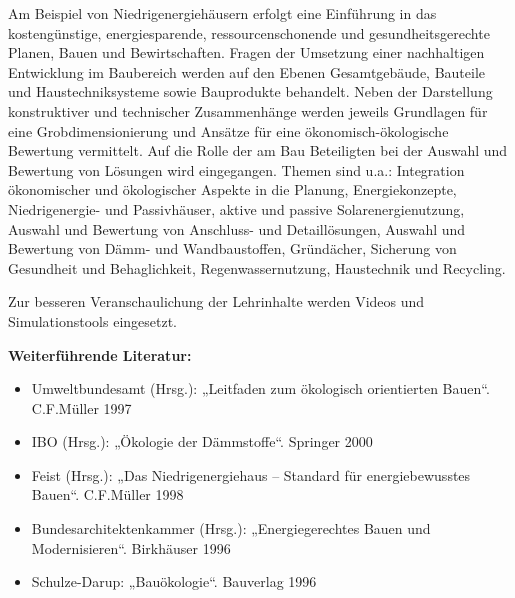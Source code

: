 \begin{course}
\begin{content}
Am Beispiel von Niedrigenergiehäusern erfolgt eine Einführung in das kostengünstige, energiesparende, ressourcenschonende und gesundheitsgerechte Planen, Bauen und Bewirtschaften. Fragen der Umsetzung einer nachhaltigen Entwicklung im Baubereich werden auf den Ebenen Gesamtgebäude, Bauteile und Haustechniksysteme sowie Bauprodukte behandelt. Neben der Darstellung konstruktiver und technischer Zusammenhänge werden jeweils Grundlagen für eine Grobdimensionierung und Ansätze für eine ökonomisch-ökologische Bewertung vermittelt. Auf die Rolle der am Bau Beteiligten bei der Auswahl und Bewertung von Lösungen wird eingegangen. Themen sind u.a.: Integration ökonomischer und ökologischer Aspekte in die Planung, Energiekonzepte, Niedrigenergie- und Passivhäuser, aktive und passive Solarenergienutzung, Auswahl und Bewertung von Anschluss- und Detaillösungen, Auswahl und Bewertung von Dämm- und Wandbaustoffen, Gründächer, Sicherung von Gesundheit und Behaglichkeit, Regenwassernutzung, Haustechnik und Recycling.


\end{content}

\begin{media}Zur besseren Veranschaulichung der Lehrinhalte werden Videos und Simulationstools eingesetzt.

\end{media}

\begin{literature}\textbf{Weiterführende Literatur:}

 \begin{itemize}\item Umweltbundesamt (Hrsg.): „Leitfaden zum ökologisch orientierten Bauen“. C.F.Müller 1997  \item IBO (Hrsg.): „Ökologie der Dämmstoffe“. Springer 2000  \item Feist (Hrsg.): „Das Niedrigenergiehaus – Standard für energiebewusstes Bauen“. C.F.Müller 1998  \item Bundesarchitektenkammer (Hrsg.): „Energiegerechtes Bauen und Modernisieren“. Birkhäuser 1996  \item Schulze-Darup: „Bauökologie“. Bauverlag 1996  \end{itemize}\end{literature}



\end{course}
